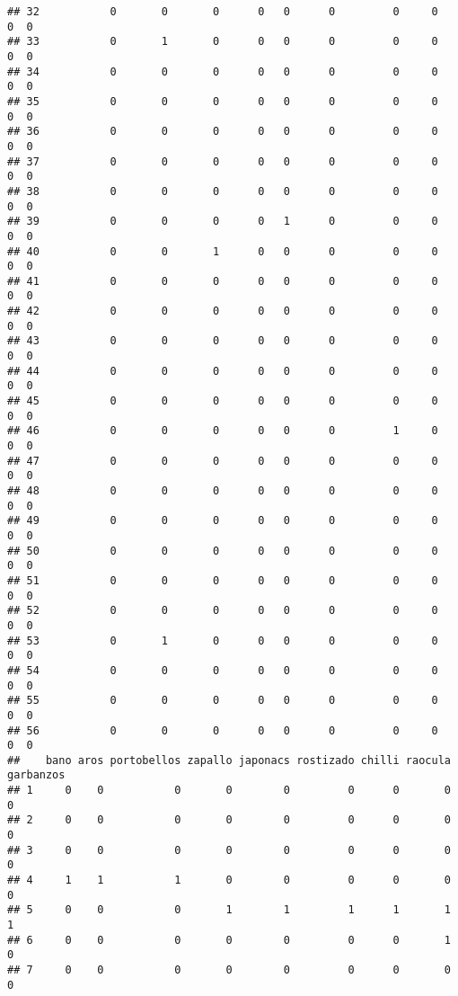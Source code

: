 \documentclass[
]{article}
\begin{document}
\begin{verbatim}
## 32           0       0       0      0   0      0         0     0       0  0
## 33           0       1       0      0   0      0         0     0       0  0
## 34           0       0       0      0   0      0         0     0       0  0
## 35           0       0       0      0   0      0         0     0       0  0
## 36           0       0       0      0   0      0         0     0       0  0
## 37           0       0       0      0   0      0         0     0       0  0
## 38           0       0       0      0   0      0         0     0       0  0
## 39           0       0       0      0   1      0         0     0       0  0
## 40           0       0       1      0   0      0         0     0       0  0
## 41           0       0       0      0   0      0         0     0       0  0
## 42           0       0       0      0   0      0         0     0       0  0
## 43           0       0       0      0   0      0         0     0       0  0
## 44           0       0       0      0   0      0         0     0       0  0
## 45           0       0       0      0   0      0         0     0       0  0
## 46           0       0       0      0   0      0         1     0       0  0
## 47           0       0       0      0   0      0         0     0       0  0
## 48           0       0       0      0   0      0         0     0       0  0
## 49           0       0       0      0   0      0         0     0       0  0
## 50           0       0       0      0   0      0         0     0       0  0
## 51           0       0       0      0   0      0         0     0       0  0
## 52           0       0       0      0   0      0         0     0       0  0
## 53           0       1       0      0   0      0         0     0       0  0
## 54           0       0       0      0   0      0         0     0       0  0
## 55           0       0       0      0   0      0         0     0       0  0
## 56           0       0       0      0   0      0         0     0       0  0
##    bano aros portobellos zapallo japonacs rostizado chilli raocula garbanzos
## 1     0    0           0       0        0         0      0       0         0
## 2     0    0           0       0        0         0      0       0         0
## 3     0    0           0       0        0         0      0       0         0
## 4     1    1           1       0        0         0      0       0         0
## 5     0    0           0       1        1         1      1       1         1
## 6     0    0           0       0        0         0      0       1         0
## 7     0    0           0       0        0         0      0       0         0

\end{verbatim}
\end{document}
